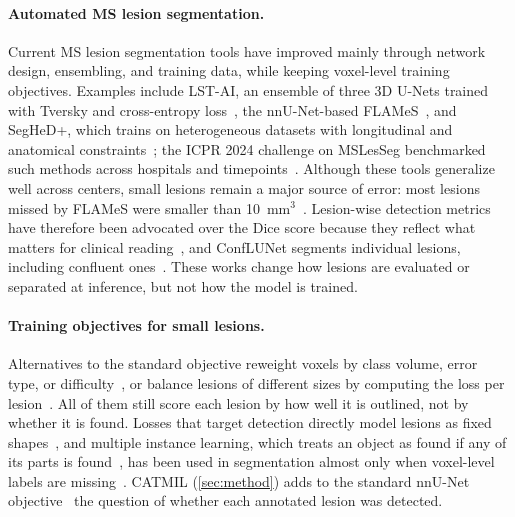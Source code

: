 \paragraph{Automated MS lesion segmentation.}
Current MS lesion segmentation tools have improved mainly through network
design, ensembling, and training data, while keeping voxel-level training
objectives. Examples include LST-AI, an ensemble of three 3D U-Nets trained
with Tversky and cross-entropy loss~\cite{wiltgen_lst-ai_2024}, the
nnU-Net-based FLAMeS~\cite{dereskewicz_flames_2025}, and SegHeD+, which
trains on heterogeneous datasets with longitudinal and anatomical
constraints~\cite{basaran_seghed_2024}; the ICPR 2024 challenge on MSLesSeg
benchmarked such methods across hospitals and
timepoints~\cite{rondinella_icpr_2024}. Although these tools generalize
well across centers, small lesions remain a major source of error: most
lesions missed by FLAMeS were smaller than
10~mm$^3$~\cite{dereskewicz_flames_2025}. Lesion-wise detection metrics
have therefore been advocated over the Dice score because they reflect what
matters for clinical reading~\cite{basit_rethinking_2026}, and
ConfLUNet segments individual lesions, including confluent
ones~\cite{wynen_conflunet_2025}. These works change how lesions are
evaluated or separated at inference, but not how the model is trained.

\paragraph{Training objectives for small lesions.}
Alternatives to the standard objective reweight voxels by class volume,
error type, or difficulty~\cite{sudre_generalised_2017,salehi_tversky_2017,lin_focal_2017,abraham_novel_2019},
or balance lesions of different sizes by computing the loss per
lesion~\cite{shirokikh_universal_2020,kofler_blob_2023,bouteille_learning_2026,bouteille_bicc_2026,molchanova_benchmarking_2025}.
All of them still score each lesion by how well it is outlined, not by
whether it is found. Losses that target detection directly model lesions as
fixed shapes~\cite{zhang_all-net_2021,rachmadi_improving_2024}, and multiple
instance learning, which treats an object as found if any of its parts is
found~\cite{dietterich_solving_1997,ilse_attention-based_2018}, has been
used in segmentation almost only when voxel-level labels are
missing~\cite{pinheiro_image-level_2015,cheng_fmamil_2025}. CATMIL
(\cref{sec:method}) adds to the standard nnU-Net
objective~\cite{isensee_nnu-net_2021} the question of whether each
annotated lesion was detected.
